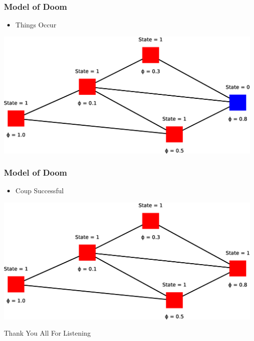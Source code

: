 \documentclass[slidestop,usenames,dvipsnames]{beamer}
\newcommand{\gitem}{\vfill\item}
\begin{document}
\begin{frame}
    \frametitle{Model of Doom}
    \begin{itemize}
        \gitem Things Occur
    \end{itemize}
    \vfill
    \includegraphics[width=\textwidth]{img/model8}
    \vfill
\end{frame}

\begin{frame}
    \frametitle{Model of Doom}
    \begin{itemize}
        \gitem Coup Successful
    \end{itemize}
    \vfill
    \includegraphics[width=\textwidth]{img/model9}
    \vfill
\end{frame}




\begin{frame}
    \vfill
    \begin{center}
        {\Huge Thank You All For Listening}\
    \end{center}
\end{frame}
\end{document}

